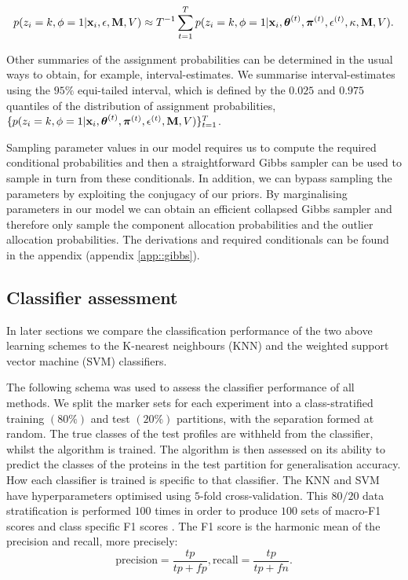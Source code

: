 \documentclass[12pt,english]{article}\usepackage[]{graphicx}\usepackage[]{color}
\begin{document}
\[p(z_i = k, \phi = 1 | {\bf x}_i, \epsilon, {\bf M}, V) \approx T^{-1}\sum_{t=1}^{T}p(z_i = k, \phi = 1 | {\bf x}_i, \boldsymbol{\theta}^{(t)}, \boldsymbol{\pi}^{(t)} , \epsilon^{(t)}, \kappa, {\bf M}, V).\]

Other summaries of the assignment probabilities can be determined in
the usual ways to obtain, for example, interval-estimates. We
summarise interval-estimates using the $95\%$ equi-tailed interval,
which is defined by the $0.025$ and $0.975$ quantiles of the
distribution of assignment probabilities,
$\{p(z_i = k, \phi = 1 | {\bf x}_i, \boldsymbol{\theta}^{(t)},
\boldsymbol{\pi}^{(t)} , \epsilon^{(t)}, {\bf M}, V) \}_{t=1}^T$.

Sampling parameter values in our model requires us to compute the
required conditional probabilities and then a straightforward Gibbs
sampler can be used to sample in turn from these conditionals. In
addition, we can bypass sampling the parameters by exploiting the
conjugacy of our priors. By marginalising parameters in our model we
can obtain an efficient collapsed Gibbs sampler and therefore only
sample the component allocation probabilities and the outlier
allocation probabilities. The derivations and required conditionals
can be found in the appendix (appendix \ref{app::gibbs}).

\subsection{Classifier assessment}\label{section::assessment}

In later sections we compare the classification performance of the two
above learning schemes to the K-nearest neighbours (KNN) and the
weighted support vector machine (SVM) classifiers.

The following schema was used to assess the classifier performance of
all methods. We split the marker sets for each experiment into a
class-stratified training $(80\%)$ and test $(20\%)$ partitions, with
the separation formed at random. The true classes of the test profiles
are withheld from the classifier, whilst the algorithm is trained. The
algorithm is then assessed on its ability to predict the classes of
the proteins in the test partition for generalisation accuracy. How
each classifier is trained is specific to that classifier.  The KNN
and SVM have hyperparameters optimised using $5$-fold
cross-validation. This $80/20$ data stratification is performed $100$
times in order to produce $100$ sets of macro-F1 \citep{He::2009}
scores and class specific F1 scores \citep{Breckels:2016}. The F1
score is the harmonic mean of the precision and recall, more
precisely:
\[\text{precision}=\frac{tp}{tp+fp}, \text{recall} = \frac{tp}{tp+fn}.\]
\end{document}
